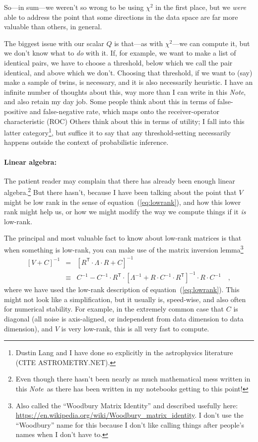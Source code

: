 \documentclass[12pt,letterpaper]{article}
\newcommand{\acronym}[1]{{\small{#1}}}
\newcommand{\documentname}{\textsl{Note}}
\newcommand{\equationname}{equation}
\newcommand{\tra}[1]{{#1}^{\mathsf{T}}}
\newcommand{\inv}[1]{{#1}^{-1}}
\begin{document}
So---in sum---we weren't so wrong to be using $\chi^2$ in the first
place, but we \emph{were} able to address the point that some directions
in the data space are far more valuable than others, in general.

The biggest issue with our scalar $Q$ is that---as with $\chi^2$---we
can compute it, but we don't know what to \emph{do} with it. If, for
example, we want to make a list of identical pairs, we have to choose
a threshold, below which we call the pair identical, and above which
we don't. Choosing that threshold, if we want to (say) make a sample
of twins, is necessary, and it is also necessarily heuristic. I have
an infinite number of thoughts about this, way more than I can write
in this \documentname, and also retain my day job. Some people think about
this in terms of false-positive and false-negative rate, which maps
onto the receiver-operator characteristic (\acronym{ROC}) Others think
about this in terms of utility; I fall into this latter
category\footnote{Dustin Lang and I have done so explicitly in the
  astrophysics literature (CITE ASTROMETRY.NET).},
but suffice it to say that any threshold-setting necessarily happens
outside the context of probabilistic inference.

\paragraph{Linear algebra:}
The patient reader may complain that there has already been enough
linear algebra.\footnote{Even though there hasn't been nearly as much
  mathematical mess written in this \documentname\ as there has been written
  in my notebooks getting to this point!}  But there hasn't, because I
have been talking about the point that $V$ might be low rank in the
sense of \equationname~(\ref{eq:lowrank}), and how this lower rank
might help us, or how we might modify the way we compute things if it
\emph{is} low-rank.

The principal and most valuable fact to know about low-rank matrices
is that when something is low-rank, you can make use of the matrix
inversion lemma\footnote{Also called the ``Woodbury Matrix Identity''
  and described usefully here:
  \url{https://en.wikipedia.org/wiki/Woodbury_matrix_identity}. I
  don't use the ``Woodbury'' name for this because I don't like
  calling things after people's names when I don't have to.}
\begin{eqnarray}
\inv{[V + C]} &=& \inv{[\tra{R}\cdot\Lambda\cdot R + C]}
\\
 &\equiv& \inv{C} - \inv{C}\cdot\tra{R}\cdot \inv{[\inv{\Lambda} + R\cdot \inv{C}\cdot\tra{R}]}\cdot R\cdot\inv{C}
\quad ,
\end{eqnarray}
where we have used the low-rank description of \equationname~(\ref{eq:lowrank}).
This might not look like a simplification, but it usually is, speed-wise, and
also often for numerical stability.
For example, in the extremely common case that $C$ is diagonal (all
noise is axis-aligned, or independent from data dimension to data
dimension), and $V$ is very low-rank, this is all very fast to
compute.
\end{document}
